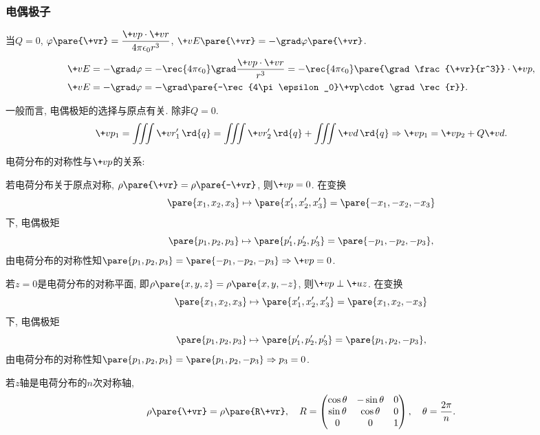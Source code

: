 \documentclass[hidelinks]{ctexart}
\begin{document}

\subsubsection{电偶极子} %
\label{ssub:电偶极子}

当$Q = 0$, $\displaystyle \varphi\pare{\+vr} = \frac{\+vp\cdot \+vr}{4\pi\epsilon_0 r^3}$, $\+vE\pare{\+vr} = -\grad \varphi\pare{\+vr}$.
\begin{align*}
    & \+vE = -\grad \varphi = -\rec{4\pi\epsilon_0} \grad \frac{\+vp\cdot \+vr}{r^3} = -\rec{4\pi\epsilon_0}\pare{\grad \frac{\+vr}{r^3}}\cdot \+vp, \\
    & \+vE = -\grad \varphi = -\grad\pare{-\rec{4\pi\epsilon_0}\+vp\cdot \grad \rec{r}}.
\end{align*}
\begin{cenum}
    \item 一般而言, 电偶极矩的选择与原点有关. 除非$Q=0$.
    \[ \+vp_1 = \iiint \+v{r}'_1\,\rd{q} = \iiint \+vr'_2\,\rd{q} + \iiint \+vd\,\rd{q} \Rightarrow \+vp_1 = \+vp_2 + Q\+vd. \]
    \item 电荷分布的对称性与$\+vp$的关系:
    \begin{cenum}
        \item 若电荷分布关于原点对称, $\rho\pare{\+vr} = \rho\pare{-\+vr}$, 则$\+vp = 0$. 在变换
        \[ \pare{x_1,x_2,x_3}\mapsto \pare{x'_1,x'_2,x'_3} = \pare{-x_1,-x_2,-x_3} \]
        下, 电偶极矩
        \[ \pare{p_1,p_2,p_3}\mapsto \pare{p'_1,p'_2,p'_3} = \pare{-p_1,-p_2,-p_3}, \]
        由电荷分布的对称性知$\pare{p_1,p_2,p_3} = \pare{-p_1,-p_2,-p_3}\Rightarrow \+vp = 0$.
        \item 若$z=0$是电荷分布的对称平面, 即$\rho\pare{x,y,z} = \rho\pare{x,y,-z}$, 则$\+vp\perp \+uz$. 在变换
        \[ \pare{x_1,x_2,x_3}\mapsto \pare{x'_1,x'_2,x'_3} = \pare{x_1,x_2,-x_3} \]
        下, 电偶极矩
        \[ \pare{p_1,p_2,p_3}\mapsto \pare{p'_1,p'_2,p'_3} = \pare{p_1,p_2,-p_3}, \]
        由电荷分布的对称性知$\pare{p_1,p_2,p_3} = \pare{p_1,p_2,-p_3}\Rightarrow p_3 = 0$.
        \item 若$z$轴是电荷分布的$n$次对称轴,
        \[ \rho\pare{\+vr} = \rho\pare{R\+vr},\quad R = \begin{pmatrix}
            \cos\theta & -\sin\theta & 0 \\
            \sin\theta & \cos\theta & 0 \\
            0 & 0 & 1
        \end{pmatrix},\quad \theta = \frac{2\pi}{n}. \]

\end{cenum}
\end{cenum}
\end{document}
